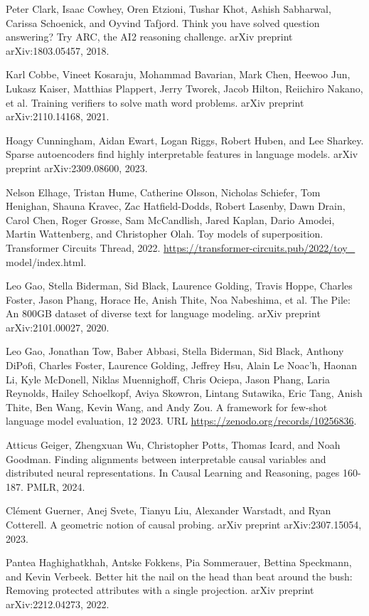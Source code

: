 \documentclass[10pt]{article}
\begin{document}
Peter Clark, Isaac Cowhey, Oren Etzioni, Tushar Khot, Ashish Sabharwal, Carissa Schoenick, and Oyvind Tafjord. Think you have solved question answering? Try ARC, the AI2 reasoning challenge. arXiv preprint arXiv:1803.05457, 2018.

Karl Cobbe, Vineet Kosaraju, Mohammad Bavarian, Mark Chen, Heewoo Jun, Lukasz Kaiser, Matthias Plappert, Jerry Tworek, Jacob Hilton, Reiichiro Nakano, et al. Training verifiers to solve math word problems. arXiv preprint arXiv:2110.14168, 2021.

Hoagy Cunningham, Aidan Ewart, Logan Riggs, Robert Huben, and Lee Sharkey. Sparse autoencoders find highly interpretable features in language models. arXiv preprint arXiv:2309.08600, 2023.

Nelson Elhage, Tristan Hume, Catherine Olsson, Nicholas Schiefer, Tom Henighan, Shauna Kravec, Zac Hatfield-Dodds, Robert Lasenby, Dawn Drain, Carol Chen, Roger Grosse, Sam McCandlish, Jared Kaplan, Dario Amodei, Martin Wattenberg, and Christopher Olah. Toy models of superposition. Transformer Circuits Thread, 2022. \href{https://transformer-circuits.pub/2022/toy_}{https://transformer-circuits.pub/2022/toy\_} model/index.html.

Leo Gao, Stella Biderman, Sid Black, Laurence Golding, Travis Hoppe, Charles Foster, Jason Phang, Horace He, Anish Thite, Noa Nabeshima, et al. The Pile: An 800GB dataset of diverse text for language modeling. arXiv preprint arXiv:2101.00027, 2020.

Leo Gao, Jonathan Tow, Baber Abbasi, Stella Biderman, Sid Black, Anthony DiPofi, Charles Foster, Laurence Golding, Jeffrey Hsu, Alain Le Noac'h, Haonan Li, Kyle McDonell, Niklas Muennighoff, Chris Ociepa, Jason Phang, Laria Reynolds, Hailey Schoelkopf, Aviya Skowron, Lintang Sutawika, Eric Tang, Anish Thite, Ben Wang, Kevin Wang, and Andy Zou. A framework for few-shot language model evaluation, 12 2023. URL \href{https://zenodo.org/records/10256836}{https://zenodo.org/records/10256836}.

Atticus Geiger, Zhengxuan Wu, Christopher Potts, Thomas Icard, and Noah Goodman. Finding alignments between interpretable causal variables and distributed neural representations. In Causal Learning and Reasoning, pages 160-187. PMLR, 2024.

Clément Guerner, Anej Svete, Tianyu Liu, Alexander Warstadt, and Ryan Cotterell. A geometric notion of causal probing. arXiv preprint arXiv:2307.15054, 2023.

Pantea Haghighatkhah, Antske Fokkens, Pia Sommerauer, Bettina Speckmann, and Kevin Verbeek. Better hit the nail on the head than beat around the bush: Removing protected attributes with a single projection. arXiv preprint arXiv:2212.04273, 2022.
\end{document}
